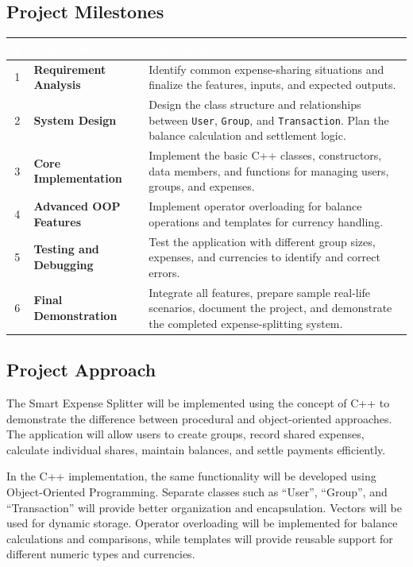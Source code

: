\documentclass[11pt,a4paper]{article}
\begin{document}
\subsection*{Project Milestones}

\begin{center}
\renewcommand{\arraystretch}{1.4}
\begin{tabularx}{\linewidth}{|c|>{\bfseries}l|X|}
\hline
\rowcolor{tableblue}
\textcolor{white}{\#} & \textcolor{white}{Milestone} & \textcolor{white}{Description} \\
\hline
1 & Requirement Analysis & Identify common expense-sharing situations and finalize the features, inputs, and expected outputs. \\
\hline
2 & System Design & Design the class structure and relationships between \texttt{User}, \texttt{Group}, and \texttt{Transaction}. Plan the balance calculation and settlement logic. \\
\hline
3 & Core Implementation & Implement the basic C++ classes, constructors, data members, and functions for managing users, groups, and expenses. \\
\hline
4 & Advanced OOP Features & Implement operator overloading for balance operations and templates for currency handling. \\
\hline
5 & Testing and Debugging & Test the application with different group sizes, expenses, and currencies to identify and correct errors. \\
\hline
6 & Final Demonstration & Integrate all features, prepare sample real-life scenarios, document the project, and demonstrate the completed expense-splitting system. \\
\hline
\end{tabularx}
\end{center}

\subsection*{Project Approach}

The Smart Expense Splitter will be implemented using the concept of C++ to demonstrate the difference between procedural and object-oriented approaches. The application will allow users to create groups, record shared expenses, calculate individual shares, maintain balances, and settle payments efficiently.

In the C++ implementation, the same functionality will be developed using Object-Oriented Programming. Separate classes such as ``User'', ``Group'', and ``Transaction'' will provide better organization and encapsulation. Vectors will be used for dynamic storage. Operator overloading will be implemented for balance calculations and comparisons, while templates will provide reusable support for different numeric types and currencies.
\end{document}
